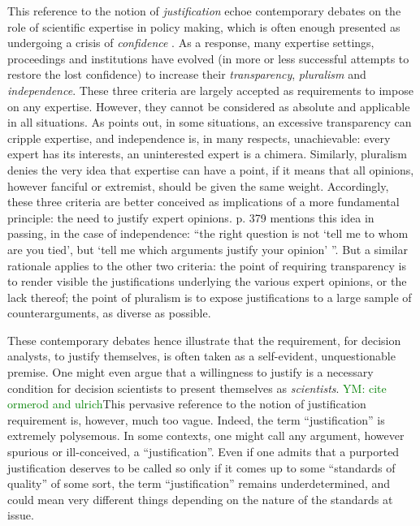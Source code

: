 \documentclass[preprint, french, english, 11pt, authoryear]{elsarticle}%
\newcommand{\commentYM}[1]{\textcolor{green}{YM: #1}}
\begin{document}
This reference to the notion of \emph{justification} echoe contemporary debates on the role of scientific expertise in policy making, which is often enough presented as undergoing a crisis of \emph{confidence} \citep{godard_environnement_2015}. As a response, many expertise settings, proceedings and institutions have evolved (in more or less successful attempts to restore the lost confidence) to increase their \emph{transparency}, \emph{pluralism} and \emph{independence}. These three criteria are largely accepted as requirements to impose on any expertise. However, they cannot be considered as absolute and applicable in all situations. As \citet{godard_environnement_2015} points out, in some situations, an excessive transparency can cripple expertise, and independence is, in many respects, unachievable: every expert has its interests, an uninterested expert is a chimera. Similarly, pluralism denies the very idea that expertise can have a point, if it means that all opinions, however fanciful or extremist, should be given the same weight. Accordingly, these three criteria are better conceived as implications of a more fundamental principle: the need to justify expert opinions. \citet{godard_environnement_2015} p. 379 mentions this idea in passing, in the case of independence: “the right question is not `tell me to whom are you tied', but `tell me which arguments justify your opinion' ”. But a similar rationale applies to the other two criteria: the point of requiring transparency is to render visible the justifications underlying the various expert opinions, or the lack thereof; the point of pluralism is to expose justifications to a large sample of counterarguments, as diverse as possible.

These contemporary debates hence illustrate that the requirement, for decision analysts, to justify themselves, is often taken as a self-evident, unquestionable premise. One might even argue that a willingness to justify is a necessary condition for decision scientists to present themselves as \emph{scientists}. \commentYM{cite ormerod and ulrich}This pervasive reference to the notion of justification requirement is, however, much too vague. Indeed, the term ``justification'' is extremely polysemous. In some contexts, one might call any argument, however spurious or ill-conceived, a ``justification''. Even if one admits that a purported justification deserves to be called so only if it comes up to some ``standards of quality'' of some sort, the term ``justification'' remains underdetermined, and could mean very different things depending on the nature of the standards at issue.
\end{document}
